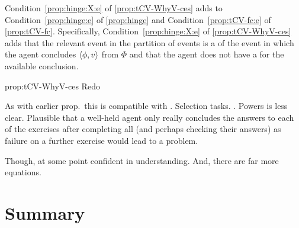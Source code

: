 \begin{note}
  Condition~\ref{prop:hinge:X:e} of \autoref{prop:tCV-WhyV-ces} adds to Condition~\ref{prop:hinge:e} of \autoref{prop:hinge} and Condition~\ref{prop:tCV-fc:e} of \autoref{prop:tCV-fc}.
  Specifically, Condition~\ref{prop:hinge:X:e} of \autoref{prop:tCV-WhyV-ces} adds that the relevant event in the partition of events is a \se{} of the event in which the agent concludes \(\langle \phi, v \rangle\) from \(\Phi\) and that the agent does not have a \wit{} for the available conclusion.

  \begin{argument}{prop:tCV-WhyV-ces}
    Redo
  \end{argument}
\end{note}


\begin{note}
  As with earlier prop.\ this is compatible with \issueConstraint{}.
  Selection tasks.
  \sqE{}.
  Powers is less clear.
  Plausible that a well-held agent only really concludes the answers to each of the exercises after completing all (and perhaps checking their answers) as failure on a further exercise would lead to a problem.

  Though, at some point confident in understanding.
  And, there are far more equations.
\end{note}





\section*{Summary}









